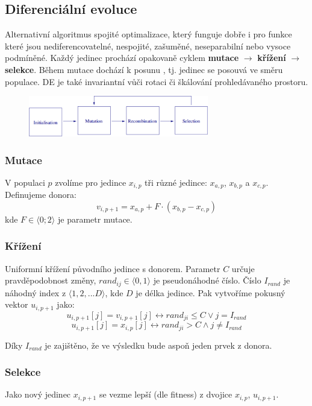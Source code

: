 \subsection{Diferenciální evoluce}
Alternativní algoritmus spojité optimalizace, který funguje dobře i pro funkce které jsou nediferencovatelné, nespojité, zašuměné, neseparabilní nebo vysoce podmíněné. Každý jedinec prochází opakovaně cyklem \textbf{mutace} $\rightarrow$ \textbf{křížení} $\rightarrow$ \textbf{selekce}. Během mutace dochází k posunu , tj. jedinec se posouvá ve směru populace. DE je také invariantní vůči rotaci či škálování prohledávaného prostoru.
\begin{figure}[H]
	\centering
	\includegraphics[width=0.7\textwidth]{img/de_scheme.png}
\end{figure}

\subsubsection{Mutace}
V populaci $p$ zvolíme pro jedince $x_{i,p}$ tři různé jedince: $x_{a,p}$, $x_{b,p}$ a $x_{c,p}$. Definujeme donora: $$v_{i,p+1} = x_{a,p} + F \cdot (x_{b,p} - x_{c,p})$$ kde $F \in \langle 0; 2 \rangle$ je parametr mutace.
\subsubsection{Křížení}
Uniformní křížení původního jedince s donorem. Parametr $C$ určuje pravděpodobnost změny, $rand_{ij} \in \langle0,1\rangle$ je pseudonáhodné číslo. Číslo $I_{rand}$ je náhodný index z $\langle 1,2,...D\rangle$, kde $D$ je délka jedince. Pak vytvoříme pokusný vektor $u_{i,p+1}$ jako:
$$u_{i,p+1}[j] = v_{i,p+1}[j] \leftrightarrow rand_{ji} \leq C \lor j = I_{rand}$$
$$u_{i,p+1}[j] = x_{i,p}[j] \leftrightarrow rand_{ji} > C \land j \neq I_{rand}$$

Díky $I_{rand}$ je zajištěno, že ve výsledku bude aspoň jeden prvek z donora.

\subsubsection{Selekce}
Jako nový jedinec $x_{i,p+1}$ se vezme lepší (dle fitness) z dvojice $x_{i,p}$, $u_{i,p+1}$.

